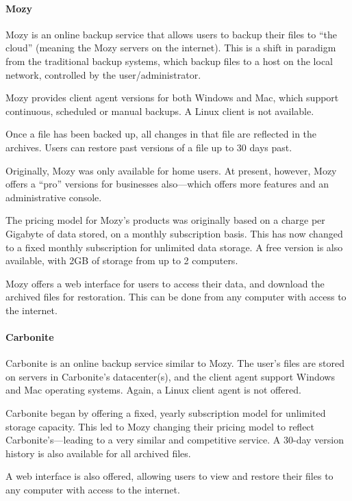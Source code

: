 \begin{bibunit}[plain]
\paragraph{Mozy}

Mozy is an online backup service that allows users to backup their files to
``the cloud'' (meaning the Mozy servers on the internet). This is a shift in
paradigm from the traditional backup systems, which backup files to a host on
the local network, controlled by the user/administrator.

Mozy provides client agent versions for both Windows and Mac, which support
continuous, scheduled or manual backups. A Linux client is not available.

Once a file has been backed up, all changes in that file are reflected in the
archives. Users can restore past versions of a file up to 30 days past.

Originally, Mozy was only available for home users. At present, however, Mozy
offers a ``pro'' versions for businesses also---which offers more features and
an administrative console.

The pricing model for Mozy's products was originally based on a charge per
Gigabyte of data stored, on a monthly subscription basis. This has now changed
to a fixed monthly subscription for unlimited data storage. A free version is
also available, with 2GB of storage from up to 2 computers.

Mozy offers a web interface for users to access their data, and download the
archived files for restoration. This can be done from any computer with access
to the internet.

\paragraph{Carbonite}

Carbonite is an online backup service similar to Mozy. The user's files are
stored on servers in Carbonite's datacenter(s), and the client agent support
Windows and Mac operating systems. Again, a Linux client agent is not offered.

Carbonite began by offering a fixed, yearly subscription model for unlimited
storage capacity. This led to Mozy changing their pricing model to reflect
Carbonite's---leading to a very similar and competitive service. A 30-day
version history is also available for all archived files.

A web interface is also offered, allowing users to view and restore their files
to any computer with access to the internet.


\end{bibunit}
